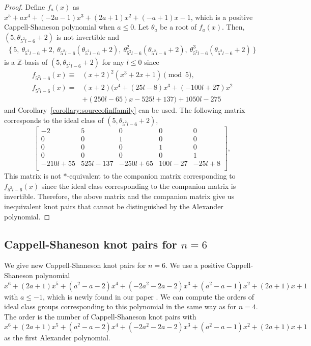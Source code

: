 \documentclass[12pt]{amsart}
\theoremstyle{plain}
\theoremstyle{definition}
\theoremstyle{remark}
\renewcommand{\(}{\big(}
\renewcommand{\)}{\big)}
\theoremstyle{plain}
\theoremstyle{definition}
\begin{document}
\begin{proof}
    Define $f_a(x)$ as $x^5+ax^4+(-2a-1)x^3+(2a+1)x^2+(-a+1)x-1$, which is a positive Cappell-Shaneson polynomial when $a \le 0$. Let $\theta_a$ be a root of $f_a(x)$. Then, $(5, \theta_{5^2l-6} + 2)$ is not invertible and 
    \[
    \begin{aligned}
    \{\, 5, \ \theta_{5^2l-6} + 2, \ \theta_{5^2l-6} ( \theta_{5^2l-6} + 2), \ \theta_{5^2l-6}^2 (\theta_{5^2l-6} + 2), \ \theta_{5^2l-6}^3 (\theta_{5^2l-6} + 2)\, \}
    \end{aligned}
    \]
    is a $\mathbb{Z}$-basis of $(5, \theta_{5^2l-6} + 2)$ for any $l \le 0$ since
    \begin{align*}
        f_{5^2l-6}(x)\equiv&(x+2)^2(x^3+2x+1) \pmod {5} ,\\
        f_{5^2l-6}(x) =&(x+2)(x^4+(25l-8)x^3+(-100l+27)x^2\\
                    &+(250l-65)x-525l+137)+1050l-275
    \end{align*}
    and Corollary~\ref{corollary:sourceofinffamily} can be used. The following matrix corresponds to the ideal class of $(5, \theta_{5^2l-6} + 2)$,
    \[
        \begin{bmatrix}
    	-2 & 5 & 0 & 0 & 0\\
            0 & 0 & 1 & 0 & 0\\
            0 & 0 & 0 & 1 & 0\\
            0 & 0 & 0 & 0 & 1\\
            -210l+55 & 525l-137 & -250l+65 & 100l-27 & -25l+8\\
    		\end{bmatrix},
    \]
    This matrix is not $*$-equivalent to the companion matrix corresponding to $f_{5^2l-6}(x)$ since the ideal class corresponding to the companion matrix is invertible. Therefore, the above matrix and the companion matrix give us inequivalent knot pairs that cannot be distinguished by the Alexander polynomial.
\end{proof}

\subsection{Cappell-Shaneson knot pairs for \texorpdfstring{$n=6$}{n=6}}
    We give new Cappell-Shaneson knot pairs for $n=6$. We use a positive Cappell-Shaneson polynomial $x^6+(2a+1)x^5+(a^2-a-2)x^4+(-2a^2-2a-2)x^3+(a^2-a-1)x^2+(2a+1)x+1$ with $a \le -1$, which is newly found in our paper \cite{Endo-Iwaki-Pajitnov:2025}. We can compute the orders of ideal class groups corresponding to this polynomial in the same way as for $n=4$. The order is the number of Cappell-Shaneson knot pairs with $x^6+(2a+1)x^5+(a^2-a-2)x^4+(-2a^2-2a-2)x^3+(a^2-a-1)x^2+(2a+1)x+1$ as the first Alexander polynomial.
\end{document}
